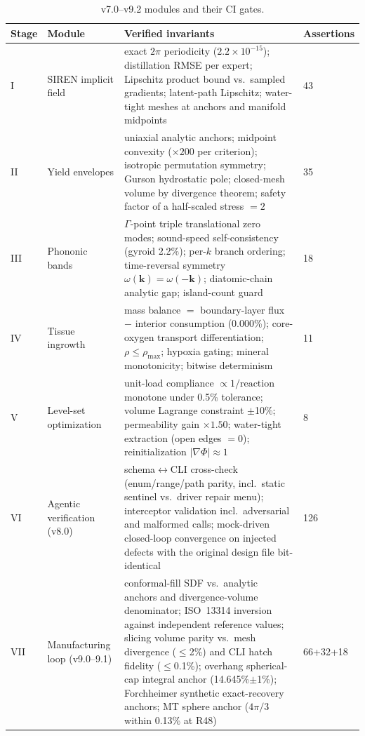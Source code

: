 \documentclass[5p,times,authoryear]{elsarticle}
\begin{document}
\begin{table}[h]
\centering
\caption{v7.0--v9.2 modules and their CI gates.}
\label{tab:gates}
\begin{tabular}{@{}llp{5.2cm}l@{}}
\toprule
Stage & Module & Verified invariants & Assertions \\
\midrule
I & SIREN implicit field & exact $2\pi$ periodicity ($2.2\times10^{-15}$); distillation RMSE per
expert; Lipschitz product bound vs.\ sampled gradients; latent-path Lipschitz; water-tight meshes
at anchors and manifold midpoints & 43 \\
II & Yield envelopes & uniaxial analytic anchors; midpoint convexity ($\times200$ per criterion);
isotropic permutation symmetry; Gurson hydrostatic pole; closed-mesh volume by divergence
theorem; safety factor of a half-scaled stress $=2$ & 35 \\
III & Phononic bands & $\Gamma$-point triple translational zero modes; sound-speed self-consistency
(gyroid 2.2\%); per-$k$ branch ordering; time-reversal symmetry $\omega(\mathbf{k})=\omega(-\mathbf{k})$;
diatomic-chain analytic gap; island-count guard & 18 \\
IV & Tissue ingrowth & mass balance $=$ boundary-layer flux $-$ interior consumption (0.000\%);
core-oxygen transport differentiation; $\rho\le\rho_{\max}$; hypoxia gating; mineral monotonicity;
bitwise determinism & 11 \\
V & Level-set optimization & unit-load compliance $\propto 1/\text{reaction}$ monotone under 0.5\%
tolerance; volume Lagrange constraint $\pm$10\%; permeability gain $\times1.50$; water-tight
extraction (open edges $=0$); reinitialization $|\nabla\Phi|\approx1$ & 8 \\
VI & Agentic verification (v8.0) & schema$\leftrightarrow$CLI cross-check (enum/range/path parity,
incl.\ static sentinel vs.\ driver repair menu); interceptor validation incl.\ adversarial and
malformed calls; mock-driven closed-loop convergence on injected defects with the original design
file bit-identical & 126 \\
VII & Manufacturing loop (v9.0--9.1) & conformal-fill SDF vs.\ analytic anchors and divergence-volume
denominator; ISO~13314 inversion against independent reference values; slicing volume parity
vs.\ mesh divergence ($\le$2\%) and CLI hatch fidelity ($\le$0.1\%); overhang spherical-cap
integral anchor (14.645\%$\pm$1\%); Forchheimer synthetic exact-recovery anchors; MT sphere
anchor ($4\pi/3$ within 0.13\% at R48) & 66+32+18 \\
\bottomrule
\end{tabular}
\end{table}
\end{document}
